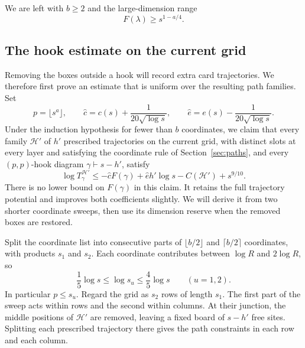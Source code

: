 We are left with \(b\ge2\) and the large-dimension range
\begin{equation}
 F(\lambda)\ge s^{1-a/4}.
 \label{ac:eq:17}
\end{equation}

\subsection{The hook estimate on the current grid}
\label{ac:part:199}

Removing the boxes outside a hook will record extra card trajectories.
We therefore first prove an estimate that is uniform over the resulting
path families. Set
\[
 p=\lfloor s^a\rfloor,\qquad
 \widehat c=c(s)+\frac{1}{20\sqrt{\log s}},\qquad
 \widehat e=e(s)-\frac{1}{20\sqrt{\log s}}.
\]
Under the induction hypothesis for fewer than \(b\) coordinates, we claim
that every family \(\mathcal H'\) of \(h'\) prescribed trajectories on
the current grid, with distinct slots at every layer and satisfying the
coordinate rule of Section~\ref{sec:paths}, and every \((p,p)\)-hook
diagram \(\gamma\vdash s-h'\), satisfy
\begin{equation}
 \log T_\gamma^{\mathcal H'}
 \le-\widehat c F(\gamma)+\widehat e h'\log s
       -C(\mathcal H')+s^{9/10}.
 \label{ac:eq:21}
\end{equation}
There is no lower bound on \(F(\gamma)\) in this claim. It retains the full
trajectory potential and improves both coefficients slightly. We will
derive it from two shorter coordinate sweeps, then use its dimension
reserve when the removed boxes are restored.

Split the coordinate list into consecutive parts of \(\lfloor b/2\rfloor\)
and \(\lceil b/2\rceil\) coordinates, with products \(s_1\) and \(s_2\).
Each coordinate contributes between \(\log R\) and \(2\log R\), so
\[
 \frac15\log s\le\log s_u\le\frac45\log s
 \qquad(u=1,2).
\]
In particular \(p\le s_u\). Regard the grid as \(s_2\) rows of length
\(s_1\). The first part of the sweep acts within rows and the second
within columns. At their junction, the middle positions of \(\mathcal H'\)
are removed, leaving a fixed board of \(s-h'\) free sites. Splitting each
prescribed trajectory there gives the path constraints in each row and
each column.

